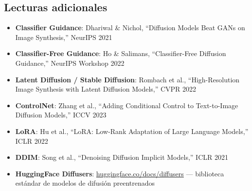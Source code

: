 \documentclass[a4paper]{article}
\begin{document}
\subsection{Lecturas adicionales}

\begin{itemize}
    \item \textbf{Classifier Guidance}: Dhariwal \& Nichol, ``Diffusion Models Beat GANs on Image Synthesis,'' NeurIPS 2021
    \item \textbf{Classifier-Free Guidance}: Ho \& Salimans, ``Classifier-Free Diffusion Guidance,'' NeurIPS Workshop 2022
    \item \textbf{Latent Diffusion / Stable Diffusion}: Rombach et al., ``High-Resolution Image Synthesis with Latent Diffusion Models,'' CVPR 2022
    \item \textbf{ControlNet}: Zhang et al., ``Adding Conditional Control to Text-to-Image Diffusion Models,'' ICCV 2023
    \item \textbf{LoRA}: Hu et al., ``LoRA: Low-Rank Adaptation of Large Language Models,'' ICLR 2022
    \item \textbf{DDIM}: Song et al., ``Denoising Diffusion Implicit Models,'' ICLR 2021
    \item \textbf{HuggingFace Diffusers}: \href{https://huggingface.co/docs/diffusers}{huggingface.co/docs/diffusers} — biblioteca estándar de modelos de difusión preentrenados
\end{itemize}

\end{document}
